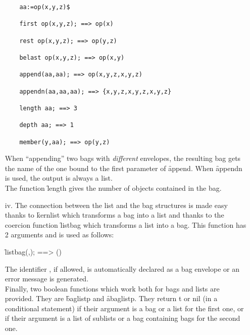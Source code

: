 \begin{itemize}
\begin{verbatim}
    aa:=op(x,y,z)$

    first op(x,y,z); ==> op(x)

    rest op(x,y,z); ==> op(y,z)

    belast op(x,y,z); ==> op(x,y)

    append(aa,aa); ==> op(x,y,z,x,y,z)

    appendn(aa,aa,aa); ==> {x,y,z,x,y,z,x,y,z}

    length aa; ==> 3

    depth aa; ==> 1

    member(y,aa); ==> op(y,z)
\end{verbatim}
When ``appending'' two bags with \emph{different} envelopes, the resulting bag
gets the name of the one bound to the first parameter of \f{append}. When  
\f{appendn} is used, the output is always a list.\\
The function \f{length} gives the number of objects contained in the 
bag.
\item[iv.]
\hypertarget{operator:LISTBAG}{}
The connection between the list and the bag structures is made easy
thanks to \f{kernlist} which transforms a bag into a list and thanks to
the coercion function \f{listbag} which transforms a list into a bag. 
This function has 2 arguments
and is used as follows:
\begin{syntax}
        \f{listbag}(,); ==> ()
\end{syntax}
The identifier , if allowed, is automatically declared as a bag
envelope or an error message is generated. \\[3pt]
\hypertarget{operator:BAGLISTP}{}
\hypertarget{operator:ABAGLISTP}{}
Finally, two boolean functions which work both for bags and lists are
provided. They are \f{baglistp} and \f{abaglistp}.
They return t or nil (in a conditional statement) if their argument
is a bag or a list for the first one, or if their argument is a list of
sublists or a bag containing bags for the second one.
\end{itemize}
